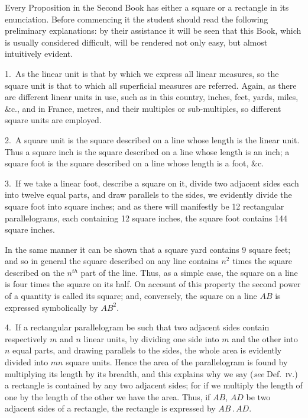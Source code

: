 \documentclass[oneside]{book}
\begin{document}
\noindent Every Proposition in the Second Book has either a
square or a rectangle in its enunciation. Before commencing
it the student should read the following preliminary
explanations: by their assistance it will be
seen that this Book, which is usually considered difficult,
will be rendered not only easy, but almost intuitively
evident.\par\medskip

\begin{footnotesize}
1.~As the linear unit is that by which we express all
linear measures, so the square unit is that to which all
superficial measures are referred. Again, as there are
different linear units in use, such as in this country,
inches, feet, yards, miles, \&c., and in France, metres,
and their multiples or sub-multiples, so different square
units are employed.

2.~A square unit is the square described on a line
whose length is the linear unit. Thus a square inch is
the square described on a line whose length is an inch;
a square foot is the square described on a line whose
length is a foot, \&c.

3.~If we take a linear foot, describe a square on it,
divide two adjacent sides each into twelve equal parts,
and draw parallels to the sides, we evidently divide the
square foot into square inches; and as there will manifestly
be 12 rectangular parallelograms, each containing
12 square inches, the square foot contains 144
square inches.

In the same manner it can be shown that a square
yard contains 9 square feet; and so in general the
square described on any line contains $n^2$ times the
square described on the $n^{th}$ part of the line. Thus, as
a simple case, the square on a line is four times the
square on its half. On account of this property the
second power of a quantity is called its square; and,
conversely, the square on a line $AB$ is expressed symbolically
by $AB^2$.

4.~If a rectangular parallelogram be such that two
adjacent sides contain respectively $m$ and $n$ linear units,
by dividing one side into $m$ and the other into $n$ equal
parts, and drawing parallels to the sides, the whole area
is evidently divided into $mn$ square units. Hence the
area of the parallelogram is found by multiplying its
length by its breadth, and this explains why we say
(\emph{see} Def.~\textsc{iv}.) a rectangle is contained by any two adjacent
sides; for if we multiply the length of one by
the length of the other we have the area. Thus, if
$AB$, $AD$ be two adjacent sides of a rectangle, the rectangle
is expressed by $AB\,.\,AD$.
\par\end{footnotesize}
\end{document}

